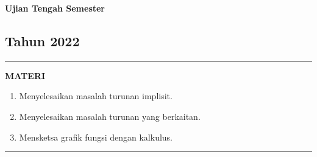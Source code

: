 \begin{flushright}
    \textbf{\Large{Ujian Tengah Semester}}
    \subsection*{Tahun 2022}
\end{flushright}


\vspace{0.5cm}\hrule height 2pt\vspace{0.5cm}


\begin{center}
\textbf{\large{MATERI}}
\begin{enumerate}[leftmargin=*, label={\arabic*}.]
\item Menyelesaikan masalah turunan implisit.
\item Menyelesaikan masalah turunan yang berkaitan.
\item Mensketsa grafik fungsi dengan kalkulus.
\end{enumerate}
\end{center}


\vspace{0.2cm}\hrule height 1pt\vspace{0.5cm}


